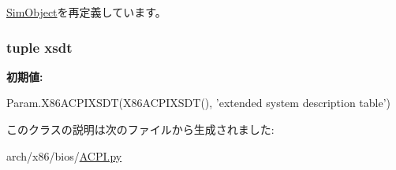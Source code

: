 \hyperlink{classm5_1_1SimObject_1_1SimObject_acce15679d830831b0bbe8ebc2a60b2ca}{SimObject}を再定義しています。\hypertarget{classACPI_1_1X86ACPIRSDP_ab79faf67e4a4a3df8b1f5a32cd623f2d}{
\subsubsection[{xsdt}]{\setlength{\rightskip}{0pt plus 5cm}tuple {\bf xsdt}}}
\label{classACPI_1_1X86ACPIRSDP_ab79faf67e4a4a3df8b1f5a32cd623f2d}
{\bfseries 初期値:}
\begin{DoxyCode}
Param.X86ACPIXSDT(X86ACPIXSDT(),
            'extended system description table')
\end{DoxyCode}


このクラスの説明は次のファイルから生成されました:\begin{DoxyCompactItemize}
\item 
arch/x86/bios/\hyperlink{ACPI_8py}{ACPI.py}\end{DoxyCompactItemize}
